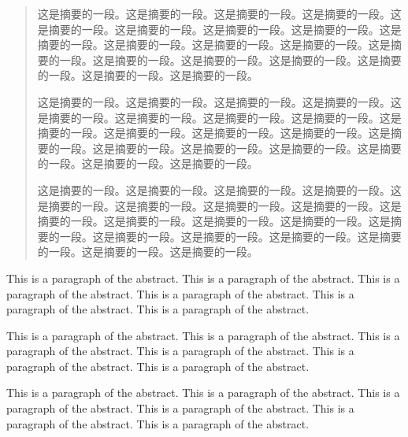 \documentclass{yacauthesisug}
\begin{document}

\makecover

\emptypage




\begin{abstract}
  这是摘要的一段。这是摘要的一段。这是摘要的一段。这是摘要的一段。这是摘要的一段。这是摘要的一段。这是摘要的一段。这是摘要的一段。这是摘要的一段。这是摘要的一段。这是摘要的一段。这是摘要的一段。这是摘要的一段。这是摘要的一段。这是摘要的一段。这是摘要的一段。这是摘要的一段。这是摘要的一段。这是摘要的一段。

  这是摘要的一段。这是摘要的一段。这是摘要的一段。这是摘要的一段。这是摘要的一段。这是摘要的一段。这是摘要的一段。这是摘要的一段。这是摘要的一段。这是摘要的一段。这是摘要的一段。这是摘要的一段。这是摘要的一段。这是摘要的一段。这是摘要的一段。这是摘要的一段。这是摘要的一段。这是摘要的一段。这是摘要的一段。

  这是摘要的一段。这是摘要的一段。这是摘要的一段。这是摘要的一段。这是摘要的一段。这是摘要的一段。这是摘要的一段。这是摘要的一段。这是摘要的一段。这是摘要的一段。这是摘要的一段。这是摘要的一段。这是摘要的一段。这是摘要的一段。这是摘要的一段。这是摘要的一段。这是摘要的一段。这是摘要的一段。这是摘要的一段。

\end{abstract}

\begin{abstract*}
  This is a paragraph of the abstract. This is a paragraph of the abstract. This is a paragraph of the abstract. This is a paragraph of the abstract. This is a paragraph of the abstract. This is a paragraph of the abstract.

  This is a paragraph of the abstract. This is a paragraph of the abstract. This is a paragraph of the abstract. This is a paragraph of the abstract. This is a paragraph of the abstract. This is a paragraph of the abstract.

  This is a paragraph of the abstract. This is a paragraph of the abstract. This is a paragraph of the abstract. This is a paragraph of the abstract. This is a paragraph of the abstract. This is a paragraph of the abstract.
\end{abstract*}
\end{document}
